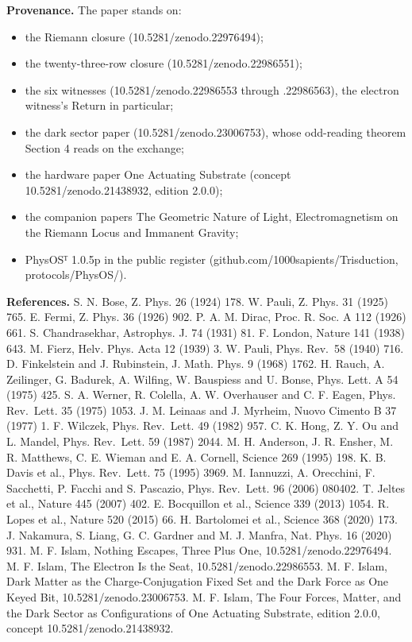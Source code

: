 \documentclass[10pt]{article}
\providecommand{\tightlist}{\setlength{\itemsep}{0pt}\setlength{\parskip}{0pt}}
\begin{document}
\sloppy

\textbf{Provenance.} The paper stands on:

\begin{itemize}
\tightlist
\item
  the Riemann closure (10.5281/\allowbreak{}zenodo.22976494);
\item
  the twenty-three-row closure (10.5281/\allowbreak{}zenodo.22986551);
\item
  the six witnesses (10.5281/\allowbreak{}zenodo.22986553 through
  .22986563), the electron witness's Return in particular;
\item
  the dark sector paper (10.5281/\allowbreak{}zenodo.23006753), whose
  odd-reading theorem Section 4 reads on the exchange;
\item
  the hardware paper One Actuating Substrate (concept
  10.5281/\allowbreak{}zenodo.21438932, edition 2.0.0);
\item
  the companion papers The Geometric Nature of Light, Electromagnetism
  on the Riemann Locus and Immanent Gravity;
\item
  PhysOSᵀ 1.0.5p in the public register
  (github.com/\allowbreak{}1000sapients/\allowbreak{}Trisduction,
  protocols/PhysOS/).
\end{itemize}

\textbf{References.} S. N. Bose, Z. Phys. 26 (1924) 178. W. Pauli, Z.
Phys. 31 (1925) 765. E. Fermi, Z. Phys. 36 (1926) 902. P. A. M. Dirac,
Proc. R. Soc. A 112 (1926) 661. S. Chandrasekhar, Astrophys. J. 74
(1931) 81. F. London, Nature 141 (1938) 643. M. Fierz, Helv. Phys. Acta
12 (1939) 3. W. Pauli, Phys. Rev.~58 (1940) 716. D. Finkelstein and J.
Rubinstein, J. Math. Phys. 9 (1968) 1762. H. Rauch, A. Zeilinger, G.
Badurek, A. Wilfing, W. Bauspiess and U. Bonse, Phys. Lett. A 54 (1975)
425. S. A. Werner, R. Colella, A. W. Overhauser and C. F. Eagen, Phys.
Rev.~Lett. 35 (1975) 1053. J. M. Leinaas and J. Myrheim, Nuovo Cimento B
37 (1977) 1. F. Wilczek, Phys. Rev.~Lett. 49 (1982) 957. C. K. Hong, Z.
Y. Ou and L. Mandel, Phys. Rev.~Lett. 59 (1987) 2044. M. H. Anderson, J.
R. Ensher, M. R. Matthews, C. E. Wieman and E. A. Cornell, Science 269
(1995) 198. K. B. Davis et al., Phys. Rev.~Lett. 75 (1995) 3969. M.
Iannuzzi, A. Orecchini, F. Sacchetti, P. Facchi and S. Pascazio, Phys.
Rev.~Lett. 96 (2006) 080402. T. Jeltes et al., Nature 445 (2007) 402. E.
Bocquillon et al., Science 339 (2013) 1054. R. Lopes et al., Nature 520
(2015) 66. H. Bartolomei et al., Science 368 (2020) 173. J. Nakamura, S.
Liang, G. C. Gardner and M. J. Manfra, Nat. Phys. 16 (2020) 931. M. F.
Islam, Nothing Escapes, Three Plus One,
10.5281/\allowbreak{}zenodo.22976494. M. F. Islam, The Electron Is the
Seat, 10.5281/\allowbreak{}zenodo.22986553. M. F. Islam, Dark Matter as
the Charge-Conjugation Fixed Set and the Dark Force as One Keyed Bit,
10.5281/\allowbreak{}zenodo.23006753. M. F. Islam, The Four Forces,
Matter, and the Dark Sector as Configurations of One Actuating
Substrate, edition 2.0.0, concept 10.5281/\allowbreak{}zenodo.21438932.
\end{document}
